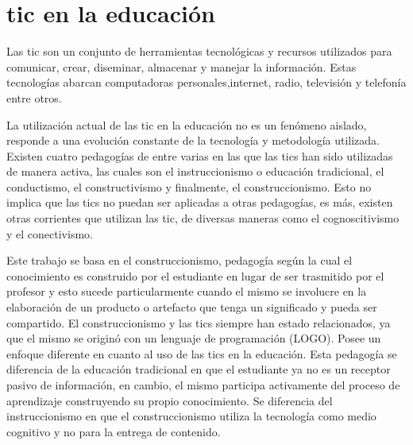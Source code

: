 \section{\Gls{tic} en la educación}

Las \Gls{tic} son un conjunto de herramientas tecnológicas y recursos utilizados para
comunicar, crear, diseminar, almacenar y manejar la
información\cite{unesco:ict}. Estas tecnologías abarcan computadoras
personales,internet, radio, televisión y telefonía\cite{tinio:ict} entre otros.

La utilización actual de las \Gls{tic} en la educación no es un fenómeno aislado,
responde a una evolución constante de la tecnología y metodología utilizada.
Existen cuatro pedagogías de entre varias en las que las tics han sido
utilizadas de manera activa, las cuales son el instruccionismo o educación
tradicional, el conductismo, el constructivismo y finalmente, el
construccionismo. Esto no implica que las tics no puedan ser aplicadas a otras
pedagogías, es más, existen otras corrientes que utilizan las \Gls{tic}, de diversas
maneras como el cognoscitivismo\cite{egenfeldt2007third} y el
conectivismo\cite{white:ict}. 

Este trabajo se basa en el construccionismo, pedagogía según la cual el
conocimiento es construido por el estudiante en lugar de ser trasmitido por el
profesor\cite{moses:2003} y esto sucede particularmente cuando el mismo se
involucre en la elaboración de un producto o artefacto que tenga un significado
y pueda ser compartido\cite{valdivia:sg}. El construccionismo y las tics siempre
han estado relacionados, ya que el mismo se originó con un lenguaje de
programación (LOGO)\cite{ict:ttc}. Posee un enfoque diferente en cuanto al uso
de las tics en la educación. Esta pedagogía se diferencia de la educación
tradicional en que el estudiante ya no es un receptor pasivo de información, en
cambio, el mismo participa activamente del proceso de aprendizaje construyendo
su propio conocimiento. Se diferencia del instruccionismo en que el
construccionismo utiliza la tecnología como medio cognitivo y no para la entrega
de contenido.


